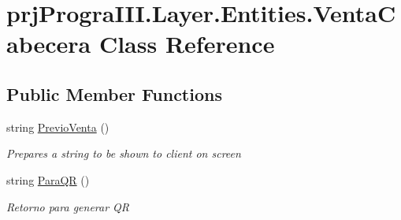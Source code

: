 \hypertarget{classprj_progra_i_i_i_1_1_layer_1_1_entities_1_1_venta_cabecera}{}\section{prj\+Progra\+I\+I\+I.\+Layer.\+Entities.\+Venta\+Cabecera Class Reference}
\label{classprj_progra_i_i_i_1_1_layer_1_1_entities_1_1_venta_cabecera}
\subsection*{Public Member Functions}
\begin{DoxyCompactItemize}
\item 
string \hyperlink{classprj_progra_i_i_i_1_1_layer_1_1_entities_1_1_venta_cabecera_a74d25a78b7a948f486fc6c850cea3b43}{Previo\+Venta} ()
\begin{DoxyCompactList}\small\item\em Prepares a string to be shown to client on screen \end{DoxyCompactList}\item 
string \hyperlink{classprj_progra_i_i_i_1_1_layer_1_1_entities_1_1_venta_cabecera_a2e03254a397ea3ee8282700399d8d416}{Para\+QR} ()
\begin{DoxyCompactList}\small\item\em Retorno para generar QR \end{DoxyCompactList}\end{DoxyCompactItemize}
